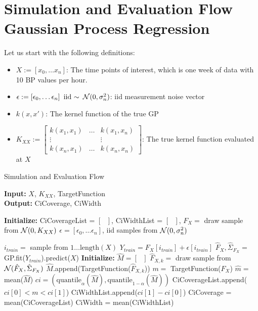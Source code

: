 \section{Simulation and Evaluation Flow Gaussian Process Regression}

Let us start with the following definitions:

    \begin{itemize}
        \item $X := \left[ x_0, \dots x_n \right]$: The time points of interest, which is one week of data with 10 BP values per hour.
        \item $\epsilon := \left[ \epsilon_0, \dots \epsilon_n \right] \text{ iid }{\sim} \text{ } \operatorname{\mathcal{N}}(0, \sigma_n^2)$: iid measurement noise vector
        \item $k(x,x')$: The kernel function of the true GP
        \item $K_{XX} := \begin{bmatrix}
        k(x_1, x_1) & \dots & k(x_1, x_n)\\
        \vdots  &  & \vdots \\
        k(x_n, x_1) & \dots  & k(x_n, x_n)
    \end{bmatrix} $: The true kernel function evaluated at $X$
    \end{itemize}

\begin{algorithm} \caption{Simulation and Evaluation Flow}
 \hspace*{\algorithmicindent} \textbf{Input:} $X$, $K_{XX}$, TargetFunction\\
 \hspace*{\algorithmicindent} \textbf{Output:} CiCoverage, CiWidth
\begin{algorithmic}[1]
    \State \textbf{Initialize:} CiCoverageList = $\left[ \text{ } \right]$, CiWidthList = $\left[ \text{ } \right]$,
        \State $F_X =$ draw sample from $\operatorname{\mathcal{N}}(0, K_{XX})$
        \State $\epsilon = \left[ \epsilon_0, \dots \epsilon_n \right]$,  iid samples from $\operatorname{\mathcal{N}}(0, \sigma_n^2)$

        \State $i_{train} =$ sample from $1 \dots \text{length}(X)$
        \State $Y_{train} = F_X\left[i_{train}\right] + \epsilon \left[i_{train}\right]$
        \State $\hat{F}_X, \hat{\Sigma}_{F_X} =$ GP.fit($Y_{train}$).predict($X$)
        \State \textbf{Initialize:} $\hat{M} = \left[ \text{ } \right]$
            \State $\hat{F}_{X,k} = $ draw sample from $\operatorname{\mathcal{N}}(\hat{F}_X, \hat{\Sigma}_{F_X} ) $
            \State $\hat{M}$.append(TargetFunction($\hat{F}_{X, k}$))
        \EndFor
    \State $m =$ TargetFunction($F_X$)
    \State $\hat{m} = $mean($\hat{M}$)
    \State $ci = (\text{quantile}_{\alpha}(\hat{M}), \text{quantile}_{1-\alpha}(\hat{M}))$
    \State CiCoverageList.append($ ci\left[0\right] < m < ci\left[1\right]$)
    \State CiWidthList.append($ci\left[1\right] - ci\left[0\right]$)
    \EndFor
    \State CiCoverage = mean(CiCoverageList)
    \State CiWidth = mean(CiWidthList)
\end{algorithmic}
\end{algorithm}


